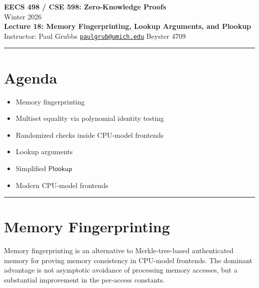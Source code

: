 \documentclass[11pt]{article}
\begin{document}
\begin{center}
  {\LARGE \textbf{EECS 498 / CSE 598: Zero-Knowledge Proofs}}\\[6pt]
  {\large Winter 2026}\\[4pt]
  {\large \textbf{Lecture 18: Memory Fingerprinting, Lookup Arguments, and Plookup}}\\[4pt]
  {\large Instructor: Paul Grubbs \quad
    \href{mailto:paulgrub@umich.edu}{\texttt{paulgrub@umich.edu}} \quad
    Beyster 4709}
\end{center}

\vspace{0.5em}
\hrule
\vspace{1em}

\section*{Agenda}
\begin{itemize}
  \item Memory fingerprinting
  \item Multiset equality via polynomial identity testing
  \item Randomized checks inside CPU-model frontends
  \item Lookup arguments
  \item Simplified $\mathsf{Plookup}$
  \item Modern CPU-model frontends
\end{itemize}

\hrule
\vspace{1em}

\section{Memory Fingerprinting}

Memory fingerprinting is an alternative to Merkle-tree-based authenticated
memory for proving memory consistency in CPU-model frontends.  The dominant
advantage is not asymptotic avoidance of processing memory accesses, but a
substantial improvement in the per-access constants.
\end{document}
